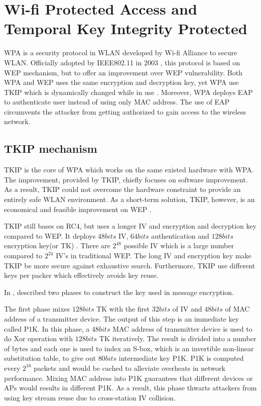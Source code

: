 \section{Wi-fi Protected Access and Temporal Key Integrity Protected}

\ac{WPA} is a security protocol in \ac{WLAN} developed by Wi-fi Alliance to secure \ac{WLAN}. Officially adopted by \ac{IEEE}802.11 in 2003 \cite{1318903}, this protocol is based on \ac{WEP} mechanism, but to offer an improvement over \ac{WEP} vulnerability. Both \ac{WPA} and \ac{WEP} uses the same encryption and decryption key, yet \ac{WPA} use \ac{TKIP} which is dynamically changed while in use \cite{wpa(wi-fiprotectedaccess)definition}. Moreover, \ac{WPA} deploys \ac{EAP} to authenticate user instead of using only \ac{MAC} address. The use of \ac{EAP} circumvents the attacker from getting authorized to gain access to the wireless network.

\subsection{TKIP mechanism}
\ac{TKIP} is the core of \ac{WPA} which works on the same existed hardware with \ac{WPA}. The improvement, provided by \ac{TKIP}, chiefly focuses on software improvement. As a result, \ac{TKIP} could not overcome the hardware constraint to provide an entirely safe \ac{WLAN} environment. As a short-term solution, \ac{TKIP}, however, is an economical and feasible improvement on \ac{WEP} \cite{al2006ieee}.

\ac{TKIP} still bases on \ac{RC4}, but uses a longer \ac{IV} and encryption and decryption key compared to \ac{WEP}. It deploys $48 bits$ \ac{IV}, $64 bits$ authentication and $128 bits$ encryption key(or \ac{TK}) \cite{potter2003wireless}. There are $2^{48}$ possible \ac{IV} which is a large number compared to $2^{24}$ IV's in traditional \ac{WEP}. The long \ac{IV} and encryption key make \ac{TKIP} be more secure against exhaustive search. Furthermore, \ac{TKIP} use different keys per packer which effectively avoids key reuse.

In \cite{doomun2012modified}, \citeauthor{doomun2012modified} described two phases to construct the key used in message encryption.

The first phase mixes $128 bits$ \ac{TK} with the first $32 bits$ of \ac{IV} and $48 bits$ of \ac{MAC} address of a transmitter device. The output of this step is an immediate key called \ac{P1K}. In this phase, a $48 bits$ \ac{MAC} address of transmitter device is used to do \ac{Xor} operation with $128 bits$ \ac{TK} iteratively. The result is divided into a number of bytes and each one is used to index an S-box, which is an invertible non-linear substitution table, to give out $80 bits$ intermediate key \ac{P1K}. \ac{P1K} is computed every $2^{16}$ packets and would be cached to alleviate overheats in network performance. Mixing \ac{MAC} address into \ac{P1K} guarantees that different devices or \ac{AP}s would results in different \ac{P1K}. As a result, this phase thwarts attackers from using key stream reuse due to cross-station \ac{IV} collision. 

